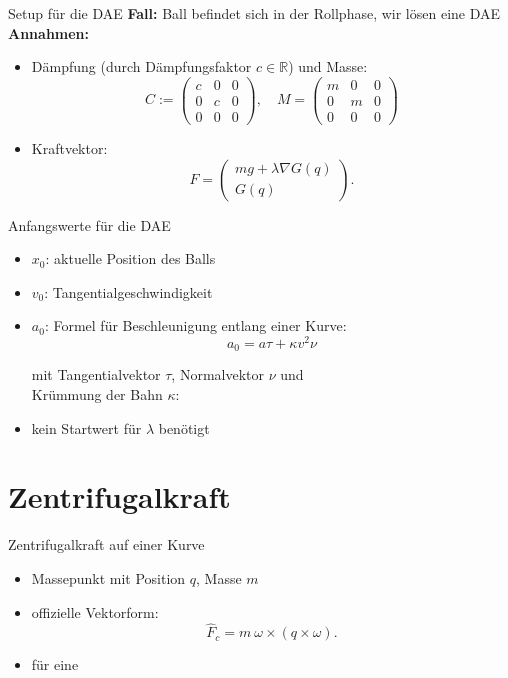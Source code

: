 \documentclass[aspectratio=169]{beamer}
\begin{document}
\begin{frame}{Setup für die DAE}
\textbf{Fall:} Ball befindet sich in der Rollphase, wir lösen eine DAE\\
\vspace{0.3cm}
\textbf{Annahmen:}
\begin{itemize}
	\item Dämpfung (durch Dämpfungsfaktor $c \in \mathbb{R}$) und Masse:
	\begin{equation*}
		C :=
		\begin{pmatrix}
			c & 0 & 0\\
			0 & c & 0\\
			0 & 0 & 0
		\end{pmatrix},
		\quad
		M =
		\begin{pmatrix}
			m & 0 & 0 \\
			0 & m & 0 \\
			0 & 0 & 0
		\end{pmatrix}
	\end{equation*}
	\item Kraftvektor:
	\[F =
	\begin{pmatrix}
		mg + \lambda \nabla G(q)\\
		G(q)
	\end{pmatrix}.
	\]
\end{itemize}

\end{frame}


\begin{frame}{Anfangswerte für die DAE}

\begin{itemize}
	\item $x_0$: aktuelle Position des Balls
	\item $v_0$: Tangentialgeschwindigkeit
	\item $a_0$: Formel für Beschleunigung entlang einer Kurve:
	\[
	a_0 = a \tau + \kappa v^2 \nu
	\]

	\qquad mit Tangentialvektor $\tau$, Normalvektor $\nu$ und\\
	\qquad Krümmung der Bahn $\kappa$:

	\item kein Startwert für $\lambda$ benötigt
\end{itemize}

\end{frame}

\section{Zentrifugalkraft}

\begin{frame}{Zentrifugalkraft auf einer Kurve}
\begin{itemize}
    \item Massepunkt mit Position $q$, Masse $m$
    \item offizielle Vektorform:
        $$
        \hat{F}_c = m ~ \omega \times (q \times \omega).
        $$
    \item für eine
\end{itemize}
\end{frame}
\end{document}
